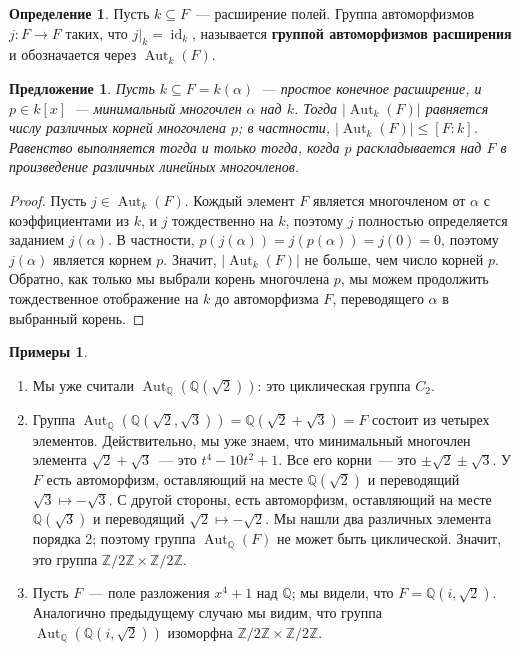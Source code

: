 \documentclass[a4paper,11pt]{scrartcl}
\theoremstyle{plain}
\newtheorem{proposition}[theorem]{Предложение}
\theoremstyle{definition}
\newtheorem{definition}[theorem]{Определение}
\newtheorem{examples}[theorem]{Примеры}
\newcommand\dfn[1]{\textbf{#1}}
\newcommand\mb{\mathbb}
\newcommand\sseq{\subseteq}
\newcommand\id{\operatorname{id}}
\newcommand\Aut{\operatorname{Aut}}
\begin{document}
\begin{definition}
Пусть $k\sseq F$~--- расширение полей. Группа автоморфизмов $j\colon
F\to F$ таких, что $j|_k=\id_k$, называется \dfn{группой автоморфизмов
  расширения} и обозначается через $\Aut_k(F)$.
\end{definition}

\begin{proposition}\label{proposition_aut_group}
Пусть $k\sseq F=k(\alpha)$~--- простое конечное расширение, и
$p\in k[x]$~--- минимальный многочлен $\alpha$ над $k$. Тогда
$|\Aut_k (F)|$ равняется числу различных корней многочлена $p$;
в частности,  $|\Aut_k(F)|\leq [F:k]$. Равенство выполняется тогда и
только тогда, когда $p$ раскладывается над $F$ в произведение
различных линейных многочленов.
\end{proposition}
\begin{proof}
Пусть $j\in\Aut_k(F)$. Кождый элемент $F$ является многочленом от
$\alpha$
с коэффициентами из $k$, и $j$ тождественно на $k$, поэтому $j$
полностью определяется заданием $j(\alpha)$.
В частности, $p(j(\alpha))=j(p(\alpha))=j(0)=0$, поэтому $j(\alpha)$
является
корнем $p$. Значит, $|\Aut_k(F)|$ не больше, чем число корней
$p$. Обратно, как только мы выбрали корень многочлена $p$, мы можем
продолжить тождественное отображение на $k$ до автоморфизма $F$,
переводящего $\alpha$ в выбранный корень.
\end{proof}

\begin{examples}
\begin{enumerate}
\item Мы уже считали $\Aut_{\mb Q}(\mb Q(\sqrt{2}))$: это циклическая
  группа $C_2$.
\item Группа $\Aut_{\mb Q}(\mb Q(\sqrt{2},\sqrt{3}))=\mb
  Q(\sqrt{2}+\sqrt{3})=F$ состоит из четырех элементов. Действительно,
  мы уже знаем, что минимальный многочлен элемента
  $\sqrt{2}+\sqrt{3}$~--- это $t^4-10t^2+1$. Все его корни~--- это
  $\pm\sqrt{2}\pm\sqrt{3}$. У $F$ есть автоморфизм, оставляющий
  на месте $\mb Q(\sqrt{2})$ и переводящий
  $\sqrt{3}\mapsto-\sqrt{3}$. С другой стороны, есть автоморфизм,
  оставляющий на месте $\mb Q(\sqrt{3})$ и переводящий
  $\sqrt{2}\mapsto-\sqrt{2}$. Мы нашли два различных элемента порядка
  2; поэтому группа $\Aut_{\mb Q}(F)$ не может быть
  циклической. Значит, это группа $\mb Z/2\mb Z\times\mb Z/2\mb Z$.
\item Пусть $F$~--- поле разложения $x^4+1$ над $\mb Q$; мы видели,
  что $F=\mb Q(i,\sqrt{2})$. Аналогично предыдущему случаю мы видим,
  что группа $\Aut_{\mb Q}(\mb Q(i,\sqrt{2}))$ изоморфна $\mb Z/2\mb
  Z\times \mb Z/2\mb Z$.
\end{enumerate}
\end{examples}
\end{document}
